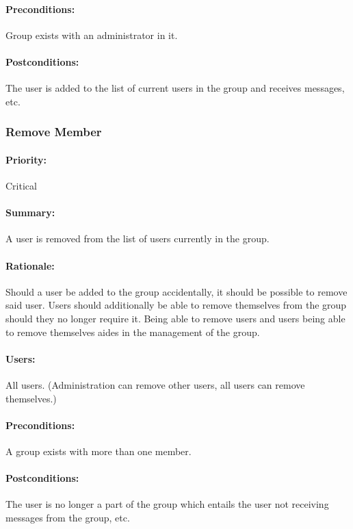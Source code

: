 \documentclass[11pt]{article}
\begin{document}
\paragraph{Preconditions:}
Group exists with an administrator in it.
\paragraph{{Postconditions:}}
The user is added to the list of current users in the group and receives messages, etc.

\subsubsection{Remove Member} \label{UC-remove-member}
\paragraph{Priority:} Critical
\paragraph{Summary:}
A user is removed from the list of users currently in the group.
\paragraph{Rationale:}
Should a user be added to the group accidentally, it should be possible to remove said user. Users should additionally be able to remove themselves from the group should they no longer require it. Being able to remove users and users being able to remove themselves aides in the management of the group.
\paragraph{Users:}
All users. (Administration can remove other users, all users can remove themselves.)
\paragraph{Preconditions:}
A group exists with more than one member.
\paragraph{{Postconditions:}}
The user is no longer a part of the group which entails the user not receiving messages from the group, etc.
\end{document}
